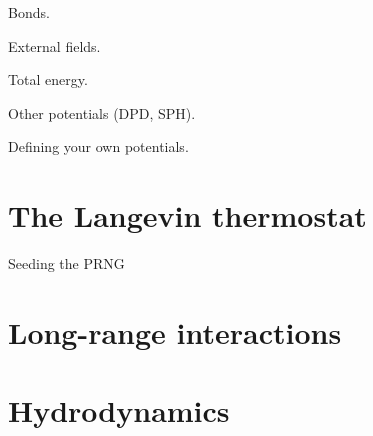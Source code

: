 \documentclass[a4paper,12pt,openany,hidelinks]{book}
\begin{document}
Bonds.

External fields.

Total energy.

Other potentials (DPD, SPH).

Defining your own potentials.

\chapter{The Langevin thermostat}

Seeding the PRNG

\chapter{Long-range interactions}

\chapter{Hydrodynamics}
\end{document}
